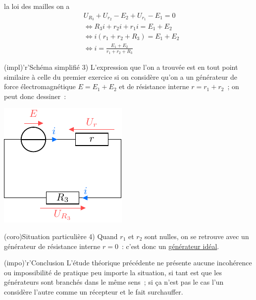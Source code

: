 \documentclass[../../main/main.tex]{subfiles}
\begin{document}
{\begin{tcbraster}[raster columns=9, raster equal height=rows]
\begin{tcb}[raster multicolumn=4]
        la loi des mailles on a
        \begin{align*}
            & U_{R_3} + U_{r_2} - E_2 + U_{r_1} - E_1 =
                0\\
            & \Leftrightarrow R_3i + r_2i + r_1i =
                E_1 + E_2\\
            & \Leftrightarrow i \left( r_1+r_2+R_3 \right) =
                E_1 + E_2\\
            & \Leftrightarrow \boxed{i = \frac{E_1 + E_2}{r_1+r_2+R_3}}
        \end{align*}
    \end{tcb}    
    \begin{tcb}[raster multicolumn=5](impl)'r'{Schéma simplifié}
        3)
        L'expression que l'on a trouvée est en tout point similaire à celle du
        premier exercice si on considère qu'on a un générateur de force
        électromagnétique $E = E_1 + E_2$ et de résistance interne $r = r_1 +
        r_2$~; on peut donc dessiner~:
        \begin{center}
            \includegraphics{assogen_ser-simple}
        \end{center}
    \end{tcb}
\end{tcbraster}
\begin{tcbraster}[raster columns=2, raster equal height=rows]
    \begin{tcb}(coro){Situation particulière}
        4)
        Quand $r_1$ et $r_2$ sont nulles, on se retrouve avec un générateur de
        résistance interne $r = 0$~: c'est donc un \underline{générateur idéal}.
    \end{tcb}
    \begin{tcb}(impo)'r'{Conclusion}
        L'étude théorique précédente ne présente aucune incohérence ou
        impossibilité de pratique peu importe la situation, si tant est que les
        générateurs sont branchés dans le même sens~; si ça n'est pas le cas
        l'un considère l'autre comme un récepteur et le fait surchauffer.
    \end{tcb}
\end{tcbraster}

}
\end{document}

